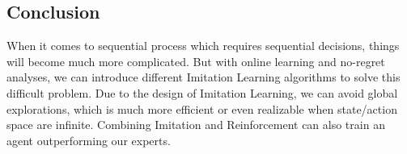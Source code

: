 \documentclass[11pt]{article}
\begin{document}
\subsection{Conclusion}
When it comes to sequential process which requires sequential decisions, things will become much more complicated. But with online learning and no-regret analyses, we can introduce different Imitation Learning algorithms to solve this difficult problem. Due to the design of Imitation Learning, we can avoid global explorations, which is much more efficient or even realizable when state/action space are infinite. Combining Imitation and Reinforcement can also train an agent outperforming our experts.


\newpage




{


}


\end{document}
